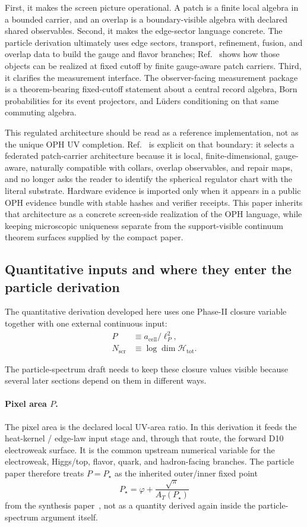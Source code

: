 \documentclass[11pt]{article}
\begin{document}
First, it makes the screen picture operational. A patch is a finite local
algebra in a bounded carrier, and an overlap is a boundary-visible algebra with declared shared
observables. Second, it makes the edge-sector
language concrete. The particle derivation ultimately uses edge sectors, transport, refinement,
fusion, and overlap data to build the gauge and flavor branches; Ref.~\cite{ophmicrophysics} shows
how those objects can be realized at fixed cutoff by finite gauge-aware patch carriers.
Third, it clarifies the measurement interface. The observer-facing measurement package is a
theorem-bearing fixed-cutoff statement about a central record algebra, Born probabilities for its
event projectors, and L\"uders conditioning on that same commuting algebra.

This regulated architecture should be read as a reference implementation, not as the unique OPH
UV completion. Ref.~\cite{ophmicrophysics} is explicit on that boundary: it selects a federated
patch-carrier architecture because it is local, finite-dimensional, gauge-aware, naturally
compatible with collars, overlap observables, and repair maps, and no longer asks the reader to
identify the spherical regulator chart with the literal substrate. Hardware evidence is imported
only when it appears in a public OPH evidence bundle with stable hashes and verifier receipts.
This paper inherits that architecture as a concrete screen-side realization of the OPH language,
while keeping microscopic uniqueness separate from the support-visible continuum theorem surfaces
supplied by the compact paper.

\subsection{Quantitative inputs and where they enter the particle derivation}

The quantitative derivation developed here uses one Phase-II closure variable together with one
external continuous input:
\begin{align}
P &\equiv a_{\mathrm{cell}}/\ell_P^2,\\
N_{\mathrm{scr}} &\equiv \log \dim \mathcal H_{\mathrm{tot}}.
\end{align}

The particle-spectrum draft needs to keep these closure values visible because several later sections
depend on them in different ways.

\paragraph{Pixel area \(P\).}
The pixel area is the declared local UV-area ratio. In this derivation it feeds the heat-kernel /
edge-law input stage and, through that route, the forward D10 electroweak surface. It is the
common upstream numerical variable for the electroweak, Higgs/top, flavor, quark, and
hadron-facing branches. The particle paper therefore treats \(P=P_\star\) as the inherited
outer/inner fixed point
\[
P_\star=\varphi+\frac{\sqrt{\pi}}{A_T(P_\star)}
\]
from the synthesis paper~\cite{ophsynthesis}, not as a quantity derived again inside the
particle-spectrum argument itself.
\end{document}
